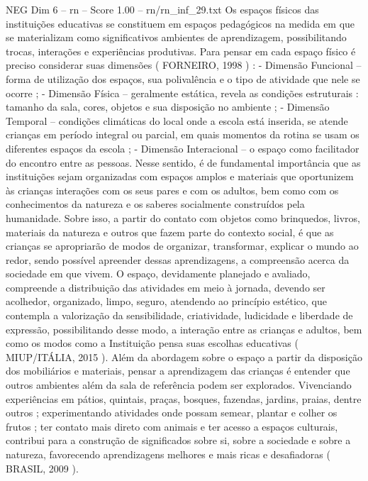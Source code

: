 \begin{textsample}{NEG Dim 6 – rn – Score 1.00 – rn/rn\_inf\_29.txt}
Os espaços físicos das instituições educativas se constituem em espaços pedagógicos na medida em que se materializam como significativos ambientes de aprendizagem, possibilitando trocas, interações e experiências produtivas.
Para pensar em cada espaço físico é preciso considerar suas dimensões ( FORNEIRO, 1998 ) : - Dimensão Funcional – forma de utilização dos espaços, sua polivalência e o tipo de atividade que nele se ocorre ; - Dimensão Física – geralmente estática, revela as condições estruturais : tamanho da sala, cores, objetos e sua disposição no ambiente ; - Dimensão Temporal – condições climáticas do local onde a escola está inserida, se atende crianças em período integral ou parcial, em quais momentos da rotina se usam os diferentes espaços da escola ; - Dimensão Interacional – o espaço como facilitador do encontro entre as pessoas.
Nesse sentido, é de fundamental importância que as instituições sejam organizadas com espaços amplos e materiais que oportunizem às crianças interações com os seus pares e com os adultos, bem como com os conhecimentos da natureza e os saberes socialmente construídos pela humanidade.
Sobre isso, a partir do contato com objetos como brinquedos, livros, materiais da natureza e outros que fazem parte do contexto social, é que as crianças se apropriarão de modos de organizar, transformar, explicar o mundo ao redor, sendo possível apreender dessas aprendizagens, a compreensão acerca da sociedade em que vivem.
O espaço, devidamente planejado e avaliado, compreende a distribuição das atividades em meio à jornada, devendo ser acolhedor, organizado, limpo, seguro, atendendo ao princípio estético, que contempla a valorização da sensibilidade, criatividade, ludicidade e liberdade de expressão, possibilitando desse modo, a interação entre as crianças e adultos, bem como os modos como a Instituição pensa suas escolhas educativas ( MIUP/ITÁLIA, 2015 ).
Além da abordagem sobre o espaço a partir da disposição dos mobiliários e materiais, pensar a aprendizagem das crianças é entender que outros ambientes além da sala de referência podem ser explorados.
Vivenciando experiências em pátios, quintais, praças, bosques, fazendas, jardins, praias, dentre outros ; experimentando atividades onde possam semear, plantar e colher os frutos ; ter contato mais direto com animais e ter acesso a espaços culturais, contribui para a construção de significados sobre si, sobre a sociedade e sobre a natureza, favorecendo aprendizagens melhores e mais ricas e desafiadoras ( BRASIL, 2009 ).

\end{textsample}
